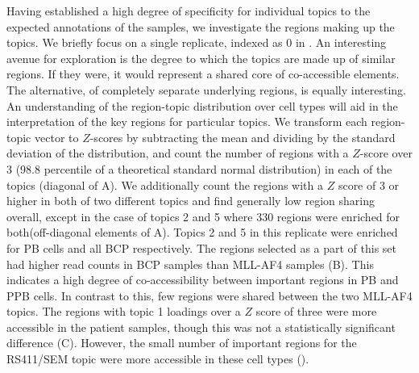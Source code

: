Having established a high degree of specificity for individual topics to the expected annotations of the samples, we investigate the regions making up the topics. We briefly focus on a single replicate, indexed as 0 in . An interesting avenue for exploration is the degree to which the topics are made up of similar regions. If they were, it would represent a shared core of co-accessible elements. The alternative, of completely separate underlying regions, is equally interesting. An understanding of the region-topic distribution over cell types will aid in the interpretation of the key regions for particular topics. We transform each region-topic vector to $Z$-scores by subtracting the mean and dividing by the standard deviation of the distribution, and count the number of regions with a $Z$-score over 3 (98.8 percentile of a theoretical standard normal distribution) in each of the topics (diagonal of A). We additionally count the regions with a $Z$ score of 3 or higher in both of two different topics and find generally low region sharing overall, except in the case of topics 2 and 5 where 330 regions were enriched for both(off-diagonal elements of A). Topics 2 and 5 in this replicate were enriched for PB cells and all BCP respectively. The regions selected as a part of this set had higher read counts in BCP samples than MLL-AF4 samples (B).  This indicates a high degree of co-accessibility between important regions in PB and PPB cells. In contrast to this, few regions were shared between the two MLL-AF4 topics. The regions with topic 1 loadings over a $Z$ score of three were more accessible in the patient samples, though this was not a statistically significant difference (C). However, the small number of important regions for the RS411/SEM topic were more accessible in these cell types ().

